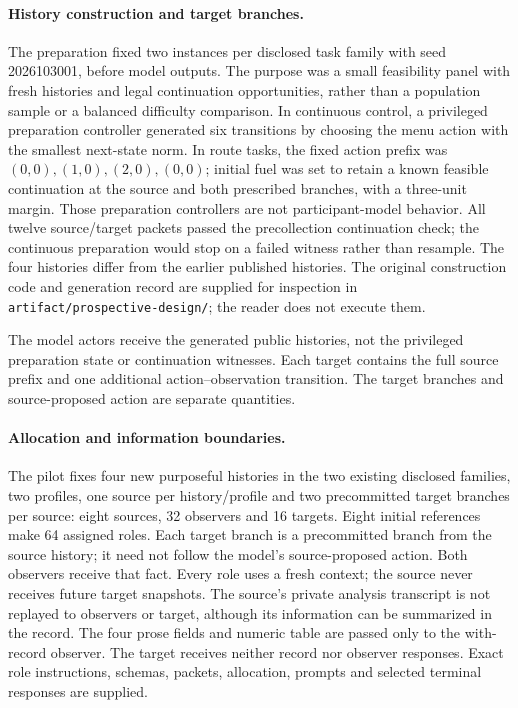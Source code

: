 \paragraph{History construction and target branches.}
The preparation fixed two instances per disclosed task family with seed
2026103001, before model outputs. The purpose was a small feasibility panel
with fresh histories and legal continuation opportunities, rather than a
population sample or a balanced difficulty comparison. In continuous
control, a privileged preparation controller generated six transitions by
choosing the menu action with the smallest next-state norm. In route tasks,
the fixed action prefix was $(0,0),(1,0),(2,0),(0,0)$; initial fuel was set to
retain a known feasible continuation at the source and both prescribed
branches, with a three-unit margin. Those preparation controllers are not
participant-model behavior. All twelve source/target packets passed the
precollection continuation check; the continuous preparation would stop on a
failed witness rather than resample. The four histories differ from the
earlier published histories. The original construction code and generation
record are supplied for inspection in \texttt{artifact/prospective-design/};
the reader does not execute them.



The model actors receive the generated public histories, not the privileged
preparation state or continuation witnesses. Each target contains the full
source prefix and one additional action--observation transition. The target
branches and source-proposed action are separate quantities.

\paragraph{Allocation and information boundaries.}
The pilot fixes four new purposeful histories in the two existing disclosed
families, two profiles, one source per history/profile and two precommitted
target branches per source: eight sources, 32 observers and 16 targets.
Eight initial references make 64 assigned roles. Each target branch is a
precommitted branch from the source history; it need not follow the model's
source-proposed action. Both observers receive that fact. Every role uses a
fresh context; the source never receives future target snapshots. The source's
private analysis transcript is not replayed to observers or target, although
its information can be summarized in the record. The four prose fields and
numeric table are passed only to the with-record observer. The target receives
neither record nor observer responses. Exact role instructions, schemas,
packets, allocation, prompts and selected terminal responses are supplied.

